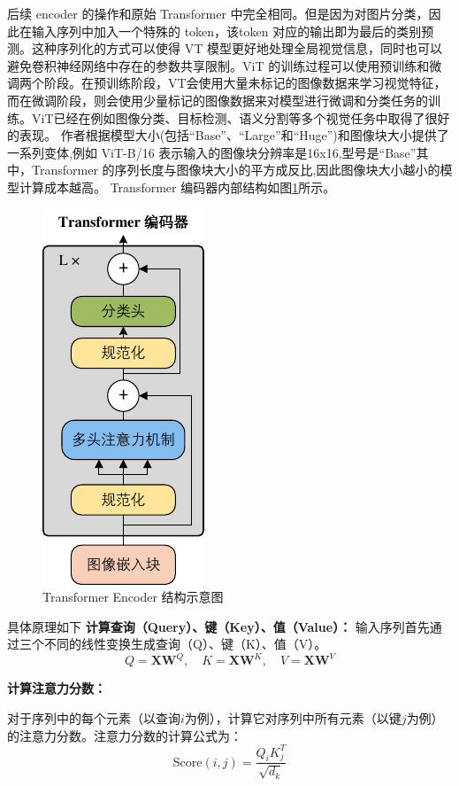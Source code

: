 \documentclass[a4paper]{zreport}
\begin{document}
后续 encoder 的操作和原始 Transformer 中完全相同。但是因为对图片分类，因此在输入序列中加入一个特殊的 token，该token 对应的输出即为最后的类别预测。这种序列化的方式可以使得 VT 模型更好地处理全局视觉信息，同时也可以避免卷积神经网络中存在的参数共享限制。ViT 的训练过程可以使用预训练和微调两个阶段。在预训练阶段，VT会使用大量未标记的图像数据来学习视觉特征，而在微调阶段，则会使用少量标记的图像数据来对模型进行微调和分类任务的训练。ViT已经在例如图像分类、目标检测、语义分割等多个视觉任务中取得了很好的表现。 作者根据模型大小(包括“Base”、“Large”和“Huge”)和图像块大小提供了一系列变体,例如 ViT-B/16 表示输入的图像块分辨率是16x16,型号是“Base”其中，Transformer 的序列长度与图像块大小的平方成反比,因此图像块大小越小的模型计算成本越高。
Transformer 编码器内部结构如图\ref{fig:encoder}所示。
\begin{figure}[h]
	\centering
	\includegraphics[scale=1]{figures/encoder}
	\caption{Transformer Encoder 结构示意图}
	\label{fig:encoder}
\end{figure}

具体原理如下
\textbf{计算查询（Query）、键（Key）、值（Value）：}
输入序列首先通过三个不同的线性变换生成查询（Q）、键（K）、值（V）。
\begin{equation}
	Q = \mathbf{XW}^Q, \quad K = \mathbf{XW}^K, \quad V = \mathbf{XW}^V
\end{equation}

\textbf{计算注意力分数：} 

对于序列中的每个元素（以查询$i$为例），计算它对序列中所有元素（以键$j$为例）的注意力分数。注意力分数的计算公式为：
\begin{equation}
	\text{Score}(i, j) = \frac{Q_i K_j^T}{\sqrt{d_k}}
\end{equation}
\end{document}
